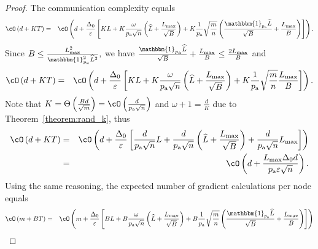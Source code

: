 \documentclass{article}
\newcommand*{\probavailable}{\ensuremath{p_{\textnormal{a}}}}
\begin{document}
  \begin{proof}
    The communication complexity equals
    \begin{eqnarray*}
        \cO\left(d + K T\right) &=& \cO\left(d + \frac{\Delta_0}{\varepsilon}\left[K L + K \frac{\omega}{\probavailable\sqrt{n}}\left(\widehat{L} + \frac{L_{\max}}{\sqrt{B}}\right) + K \frac{1}{\probavailable}\sqrt{\frac{m}{n}}\left(\frac{\mathbbm{1}_{\probavailable}\widehat{L}}{\sqrt{B}} + \frac{L_{\max}}{B}\right)\right]\right).
    \end{eqnarray*}
    Since $B \leq \frac{L_{\max}^2}{\mathbbm{1}_{\probavailable}^2 \widehat{L}^2},$ we have $\frac{\mathbbm{1}_{\probavailable}\widehat{L}}{\sqrt{B}} + \frac{L_{\max}}{B} \leq \frac{2 L_{\max}}{B}$ and 
    \begin{eqnarray*}
      \cO\left(d + K T\right) &=& \cO\left(d + \frac{\Delta_0}{\varepsilon}\left[K L + K \frac{\omega}{\probavailable\sqrt{n}}\left(\widehat{L} + \frac{L_{\max}}{\sqrt{B}}\right) + K \frac{1}{\probavailable}\sqrt{\frac{m}{n}}\frac{L_{\max}}{B}\right]\right).
    \end{eqnarray*}
    Note that $K = \Theta\left(\frac{B d}{\sqrt{m}}\right) = \cO\left(\frac{d}{\probavailable\sqrt{n}}\right)$ and $\omega + 1 = \frac{d}{K}$ due to Theorem~\ref{theorem:rand_k}, thus 
    \begin{eqnarray*}
      \cO\left(d + K T\right) &=& \cO\left(d + \frac{\Delta_0}{\varepsilon}\left[\frac{d}{\probavailable\sqrt{n}} L + \frac{d}{\probavailable\sqrt{n}}\left(\widehat{L} + \frac{L_{\max}}{\sqrt{B}}\right) + \frac{d}{\probavailable \sqrt{n}}L_{\max}\right]\right) \\
      &=& \cO\left(d + \frac{L_{\max} \Delta_0 d}{\probavailable \varepsilon \sqrt{n}}\right).
    \end{eqnarray*}
    Using the same reasoning, the expected number of gradient calculations per node equals
    \begin{eqnarray*}
        \cO\left(m + B T\right) &=& \cO\left(m + \frac{\Delta_0}{\varepsilon}\left[B L + B \frac{\omega}{\probavailable\sqrt{n}}\left(\widehat{L} + \frac{L_{\max}}{\sqrt{B}}\right) + B \frac{1}{\probavailable}\sqrt{\frac{m}{n}}\left(\frac{\mathbbm{1}_{\probavailable}\widehat{L}}{\sqrt{B}} + \frac{L_{\max}}{B}\right)\right]\right) \\

\end{eqnarray*}
\end{proof}
\end{document}
